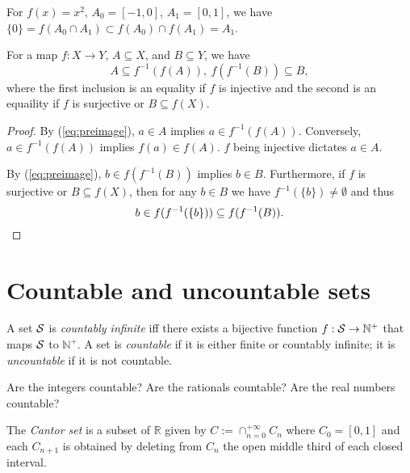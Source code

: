 \begin{exm}
  For $f(x)=x^2$, $A_0=[-1,0]$, $A_1=[0,1]$,
  we have $\{0\}=f(A_0\cap A_1)\subset f(A_0)\cap f(A_1)=A_1$.
\end{exm}

\begin{lem}
  \label{lem:preimageSubsetIdentites}
  For a map $f: X\rightarrow Y$, $A\subseteq X$,
  and $B\subseteq Y$,
  we have
  \begin{equation}
    \label{eq:preimageSubsetIdentites}
    A \subseteq f^{-1}(f(A)),\
    f(f^{-1}(B))\subseteq B,
  \end{equation}
  where the first inclusion
  is an equality if $f$ is injective 
  and the second is an equaility
  if $f$ is surjective or $B\subseteq f(X)$.
\end{lem}
\begin{proof}
  By (\ref{eq:preimage}), $a\in A$ implies
  $a\in f^{-1}(f(A))$.
  Conversely, $a\in f^{-1}(f(A))$ implies
   $f(a)\in f(A)$.
   $f$ being injective dictates $a\in A$.

  By (\ref{eq:preimage}), $b\in f(f^{-1}(B))$ implies
  $b\in B$.
  Furthermore, if $f$ is surjective or $B\subseteq f(X)$,
  then for any $b\in B$ we have $f^{-1}(\{b\})\ne \emptyset$
  and thus
  \begin{displaymath}
    b\in f(f^{-1}(\{b\})) \subseteq f(f^{-1}(B)).\qedhere
  \end{displaymath}
\end{proof}


\section{Countable and uncountable sets}
\label{sec:count-unco-sets}

\begin{defn}
  \label{def:countability}
  A set ${\cal S}$ is \emph{countably infinite}
   iff there exists a bijective function
   $f:{\cal S}\rightarrow \mathbb{N}^+$
   that maps ${\cal S}$ to $\mathbb{N}^+$.
  A set is \emph{countable}
  if it is either finite or countably infinite;
  it is \emph{uncountable}
  if it is not countable.
\end{defn}

\begin{exc}
  Are the integers countable?
  Are the rationals countable?
  Are the real numbers countable?
\end{exc}

\begin{defn}
  \label{def:CantorSet}
  The \emph{Cantor set} is a subset of $\mathbb{R}$
  given by $C:=\cap_{n=0}^{+\infty} C_n$
  where $C_0=[0,1]$
  and each $C_{n+1}$ is obtained
  by deleting from $C_n$ the open middle third
  of each closed interval. %
\end{defn}

